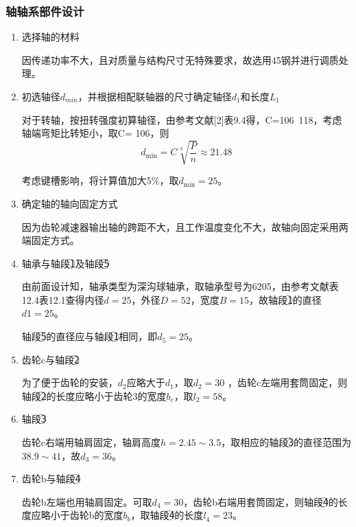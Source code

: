 \subsubsection{\uppercase\expandafter{}轴轴系部件设计}
\begin{enumerate}[i]
	\item 选择轴的材料
	\par 因传递功率不大，且对质量与结构尺寸无特殊要求，故选用45钢并进行调质处理。

	\item 初选轴径$d_{min}$，并根据相配联轴器的尺寸确定轴径$d_1$和长度$L_1$
	\par 对于转轴，按扭转强度初算轴径，由参考文献[2]表9.4得，C=106~118，考虑轴端弯矩比转矩小，取C= 106，则$$d_{\min}=C\sqrt[3]{\frac{P}{n}}\approx 21.48$$
	\par 考虑键槽影响，将计算值加大5\%，取$d_{\min}=25$。
	
	\item 确定轴的轴向固定方式
	\par 因为齿轮减速器输出轴的跨距不大，且工作温度变化不大，故轴向固定采用两端固定方式。
	
	\item 	轴承与轴段\textcircled{1}及轴段\textcircled{5}
	\par 由前面设计知，轴承类型为深沟球轴承，取轴承型号为6205，由参考文献\cite{1}表12.4表12.1查得内径$d=25$，外径$D=52$，宽度$B=15$，故轴段\textcircled{1}的直径$d1=25$。
	\par 轴段\textcircled{5}的直径应与轴段\textcircled{1}相同，即$d_5=25$。

	\item 齿轮c与轴段\textcircled{2}
	\par 为了便于齿轮的安装，$d_2$应略大于$d_1$，取$d_2=30$ ，齿轮c左端用套筒固定，则轴段\textcircled{2}的长度应略小于齿轮3的宽度$b_c$，取$l_2=58$。
	
	\item 轴段\textcircled{3}
	\par 齿轮c右端用轴肩固定，轴肩高度$h=2.45\sim 3.5$，取相应的轴段\textcircled{3}的直径范围为$38.9\sim 41$，故$d_3=36$。 
	
	\item 齿轮b与轴段\textcircled{4}
	\par 齿轮b左端也用轴肩固定。可取$d_4=30$，齿轮b右端用套筒固定，则轴段\textcircled{4}的长度应略小于齿轮b的宽度$b_b$，取轴段\textcircled{4}的长度$l_4=23$。
	

\end{enumerate}
